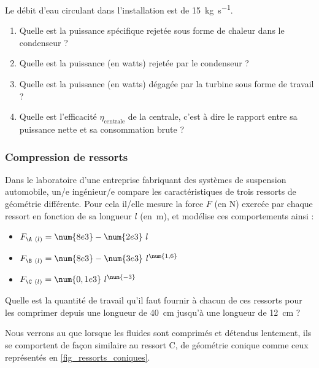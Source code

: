 	Le débit d’eau circulant dans l’installation est de \SI{15}{\kilogram\per\second}.

	\begin{enumerate}
		\item Quelle est la puissance spécifique rejetée sous forme de chaleur dans le condenseur ?
		\item Quelle est la puissance (en \si{watts}) rejetée par le condenseur ?
		\item Quelle est la puissance (en \si{watts}) dégagée par la turbine sous forme de travail ?
		\item Quelle est l’efficacité $\eta_{\text{centrale}}$ de la centrale, c’est à dire le rapport entre sa puissance nette et sa consommation brute ?
	\end{enumerate}	

\subsubsection{Compression de ressorts}
\label{exo_compression_ressorts}
	
	Dans le laboratoire d’une entreprise fabriquant des systèmes de suspension automobile, un/e ingénieur/e compare les caractéristiques de trois ressorts de géométrie différente. Pour cela il/elle mesure la force $F$ (en \si{\newton}) exercée par chaque ressort en fonction de sa longueur $l$ (en~\si{\metre}), et modélise ces comportements ainsi :
	
		\begin{itemize}
			\item \onlyframabook{~~}$F_{\A\ (l)} = \num{8e3} - \num{2e3} \ l$
			\item \onlyframabook{~~}$F_{\B\ (l)} = \num{8e3} - \num{3e3} \ l^{\num{1,6}}$
			\item \onlyframabook{~~}$F_{\C\ (l)} = \num{0,1e3} \ l^{\num{-3}}$
		\end{itemize}
		
	Quelle est la quantité de travail qu’il faut fournir à chacun de ces ressorts pour les comprimer depuis une longueur de \SI{40}{\centi\metre} jusqu’à une longueur de \SI{12}{\centi\metre} ?
	
	Nous verrons au \coursdeux que lorsque les fluides sont comprimés et détendus lentement, ils se comportent de façon similaire au ressort C, de géométrie conique comme ceux représentés en \cref{fig_ressorts_coniques}.
	
